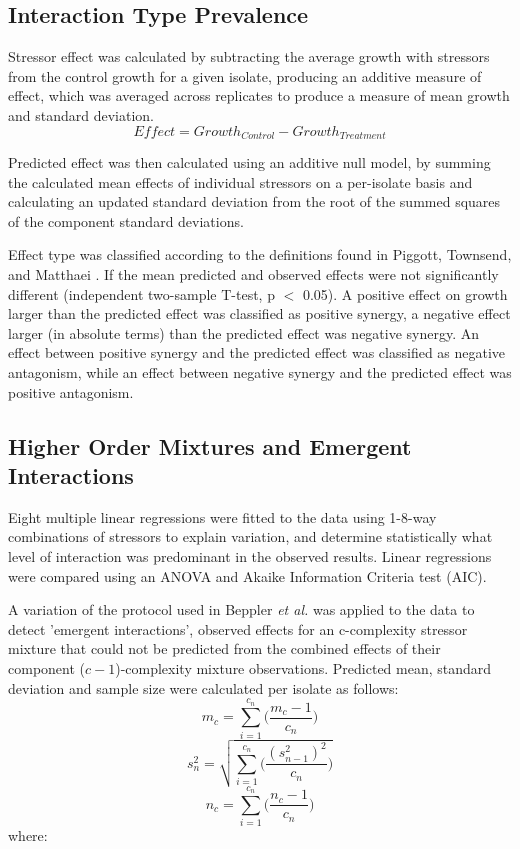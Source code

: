 \documentclass[final,1p,times]{elsarticle}
\begin{document}
\subsection{Interaction Type Prevalence}
\label{S:2:9}
Stressor effect was calculated by subtracting the average growth with stressors from the control growth for a given isolate, producing an additive measure of effect, which was averaged across replicates to produce a measure of mean growth and standard deviation.
\begin{equation}
Effect = Growth_{Control} - Growth_{Treatment}
\label{E:effect_calc}
\end{equation}

Predicted effect was then calculated using an additive null model, by summing the calculated mean effects of individual stressors on a per-isolate basis and calculating an updated standard deviation from the root of the summed squares of the component standard deviations. 

Effect type was classified according to the definitions found in Piggott, Townsend, and Matthaei \cite{Piggott2015}. If the mean predicted and observed effects were not significantly different (independent two-sample T-test, p $<$ 0.05). A positive effect on growth larger than the predicted effect was classified as positive synergy, a negative effect larger (in absolute terms) than the predicted effect was negative synergy. An effect between positive synergy and the predicted effect was classified as negative antagonism, while an effect between negative synergy and the predicted effect was positive antagonism. 

\subsection{Higher Order Mixtures and Emergent Interactions}
\label{S:2:10}
Eight multiple linear regressions were fitted to the data using 1-8-way combinations of stressors to explain variation, and determine statistically what level of interaction was predominant in the observed results. Linear regressions were compared using an ANOVA and Akaike Information Criteria test (AIC). 

A variation of the protocol used in Beppler \textit{et al.} \cite{Beppler2016UncoveringStressors} was applied to the data to detect 'emergent interactions', observed effects for an c-complexity stressor mixture that could not be predicted from the combined effects of their component ($c-1$)-complexity mixture observations. Predicted mean, standard deviation and sample size were calculated per isolate as follows: 
\begin{equation}
    m_c = \sum_{i = 1}^{c_n}\Big(\frac{m_c-1}{c_n}\Big)
\label{E:pred_mean}    
\end{equation}
\begin{equation}
    s^2_n = \sqrt{\sum_{i = 1}^{c_n}\bigg(\frac{(s^2_{n-1})^2}{c_n}\bigg)}
\label{E:pred_sd}    
\end{equation}
\begin{equation}
    n_c = \sum_{i = 1}^{c_n}\Big(\frac{n_c-1}{c_n}\Big)
\label{E:pred_n}    
\end{equation}
where:
\end{document}
